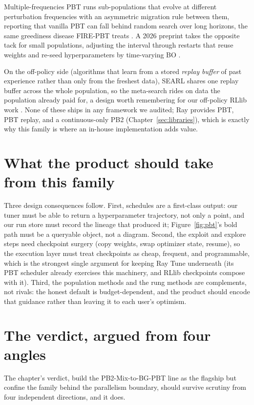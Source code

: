 Multiple-frequencies PBT runs sub-populations
that evolve at different perturbation frequencies with an asymmetric
migration rule between them, reporting that vanilla PBT can fall behind
random search over long horizons, the same greediness disease FIRE-PBT
treats \citep{doulazmi2025mfpbt}. A 2026 preprint takes the opposite
tack for small populations, adjusting the interval through restarts
that reuse weights and re-seed hyperparameters by time-varying BO
\citep{chebykin2025ipbt}.

On the off-policy side (algorithms that learn from a stored
\emph{replay buffer} of past experience rather than only from the
freshest data), SEARL shares one replay
buffer across the whole population, so the meta-search rides on data the
population already paid for, a design worth remembering for our
off-policy RLlib work \citep{franke2021searl}. None of these ships in
any framework we audited; Ray provides PBT, PBT replay, and a
continuous-only PB2 (Chapter~\ref{sec:libraries}), which is exactly why
this family is where an in-house implementation adds value.

\section{What the product should take from this family}

Three design consequences follow. First, schedules are a first-class
output: our tuner must be able to return a hyperparameter trajectory,
not only a point, and our run store must record the lineage that
produced it; Figure~\ref{fig:pbt}'s bold path must be a queryable
object, not a diagram. Second, the exploit and explore steps need
checkpoint surgery (copy weights, swap optimizer state, resume), so the
execution layer must treat checkpoints as cheap, frequent, and
programmable, which is the strongest single argument for keeping Ray
Tune underneath (its PBT scheduler already exercises this machinery,
and RLlib checkpoints compose with it). Third, the population methods
and the rung methods are complements, not rivals: the honest default is
budget-dependent, and the product should encode that guidance rather
than leaving it to each user's optimism.

\section{The verdict, argued from four angles}
\label{sec:pop-angles}

The chapter's verdict, build the PB2-Mix-to-BG-PBT line as the
flagship but confine the family behind the parallelism boundary,
should survive scrutiny from four independent directions, and it does.

